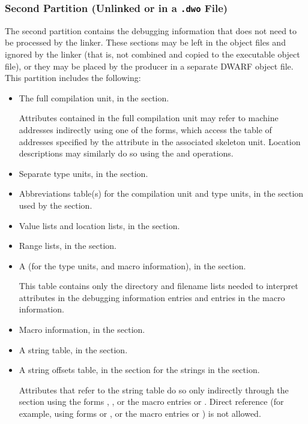 \subsubsection{Second Partition (Unlinked or in a \texttt{.dwo} File)}
\label{datarep:secondpartition}
The second partition contains the debugging information that
does not need to be processed by the linker. These sections
may be left in the object files and ignored by the linker
(that is, not combined and copied to the executable object file), or
they may be placed by the producer in a separate DWARF object
file. This partition includes the following:
\begin{itemize}
\item
The full compilation unit, in the \dotdebuginfodwo{} section.

Attributes contained in the full compilation unit
may refer to machine addresses indirectly using 
one of the \DWFORMaddrxXNor{} 
forms, which access the table of addresses specified by the
\DWATaddrbase{} attribute in the associated skeleton unit.
Location descriptions may similarly do so using the \DWOPaddrx{} and
\DWOPconstx{} operations. 

\item Separate type units, in the \dotdebuginfodwo{} section.

\item
Abbreviations table(s) for the compilation unit and type
units, in the \dotdebugabbrevdwo{} section
used by the \dotdebuginfodwo{} section.

\item 
\bb
Value lists and location
\eb
lists, in the \dotdebugloclistsdwo{} section.

\item Range lists, in the \dotdebugrnglistsdwo{} section.

\item
A  (for the type 
\bb
units, and macro information), 
\eb
in the \dotdebuglinedwo{} section. 

This table
contains only the directory and filename lists needed to
interpret \DWATdeclfile{} attributes in the debugging
information entries
\bb
and \DWMACROstartfile{} entries in the macro information.
\eb

\item Macro information, in the \dotdebugmacrodwo{} section.

\item A string table, in the \dotdebugstrdwo{} section.

\item A string offsets table, in the \dotdebugstroffsetsdwo{}
section
for the strings in the \dotdebugstrdwo{} section.

\bb
Attributes that refer to the \dotdebugstrdwo{} string table do so
only indirectly through the \dotdebugstroffsetsdwo{} section using the
forms \DWFORMstrx, \DWFORMstrxNor, or the macro entries
\DWMACROdefinestrx{} or \DWMACROundefstrx.
Direct reference (for example, using forms \DWFORMstrp{} or \DWFORMstrpeight, or
the macro entries \DWMACROdefinestrp{} or \DWMACROundefstrp)
is not allowed.
\eb
\end{itemize}

